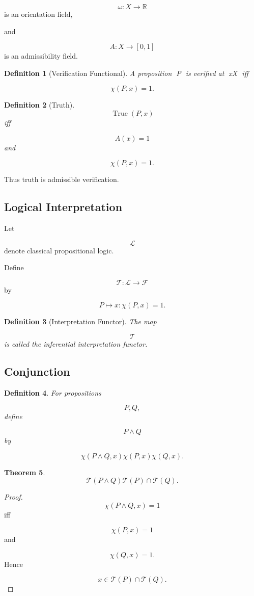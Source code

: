 \documentclass[12pt]{article}
\newtheorem{theorem}{Theorem}[section]
\newtheorem{definition}[theorem]{Definition}
\theoremstyle{remark}
\begin{document}
\[
\omega:X\rightarrow\mathbb R
\]
is an orientation field,

and

\[
A:X\rightarrow[0,1]
\]
is an admissibility field.

\begin{definition}[Verification Functional]
A proposition P is verified at x\in X iff

\[
\chi(P,x)=1.
\]
\end{definition}
\begin{definition}[Truth]
\[
\operatorname{True}(P,x)
\]
iff

\[
A(x)=1
\]
and

\[
\chi(P,x)=1.
\]
\end{definition}
Thus truth is admissible verification.

\subsection{Logical Interpretation}

Let

\[
\mathcal L
\]
denote classical propositional logic.

Define

\[
\mathcal T
:
\mathcal L
\rightarrow
\mathcal F
\]
by

\[
P
\mapsto
{x:\chi(P,x)=1}.
\]
\begin{definition}[Interpretation Functor]
The map

\[
\mathcal T
\]
is called the inferential interpretation functor.
\end{definition}

\subsection{Conjunction}

\begin{definition}
For propositions

\[
P,Q,
\]
define

\[
P\wedge Q
\]
by

\[
\chi(P\wedge Q,x)
\chi(P,x)\chi(Q,x).
\]
\end{definition}

\begin{theorem}
\[
\mathcal T(P\wedge Q)
\mathcal T(P)
\cap
\mathcal T(Q).
\]
\end{theorem}

\begin{proof}
\[
\chi(P\wedge Q,x)=1
\]
iff

\[
\chi(P,x)=1
\]
and

\[
\chi(Q,x)=1.
\]
Hence

\[
x
\in
\mathcal T(P)\cap\mathcal T(Q).
\]
\end{proof}
\end{document}

